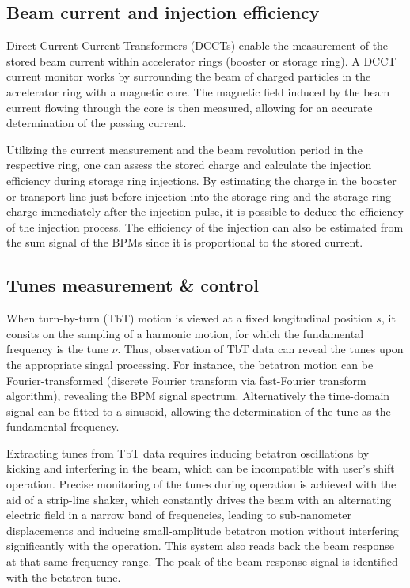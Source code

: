 \subsection{Beam current and injection efficiency}
Direct-Current Current Transformers (DCCTs) enable the measurement of the stored beam current within accelerator rings (booster or storage ring). A DCCT current monitor works by surrounding the beam of charged particles in the accelerator ring with a magnetic core. The magnetic field induced by the beam current flowing through the core is then measured, allowing for an accurate determination of the passing current.

Utilizing the current measurement and the beam revolution period in the respective ring, one can assess the stored charge and calculate the injection efficiency during storage ring injections. By estimating the charge in the booster or transport line just before injection into the storage ring and the storage ring charge immediately after the injection pulse, it is possible to deduce the efficiency of the injection process. The efficiency of the injection can also be estimated from the sum signal of the BPMs since it is proportional to the stored current.

\subsection{Tunes measurement \& control}
When turn-by-turn (TbT) motion is viewed at a fixed longitudinal position $s$, it consits on the sampling of a harmonic motion, for which the fundamental frequency is the tune $\nu$. Thus, observation of TbT data can reveal the tunes upon the appropriate singal processing. For instance, the betatron motion can be Fourier-transformed (discrete Fourier transform via fast-Fourier transform algorithm), revealing the BPM signal spectrum. Alternatively the time-domain signal can be fitted to a sinusoid, allowing the determination of the tune as the fundamental frequency.

Extracting tunes from TbT data requires inducing betatron oscillations by kicking and interfering in the beam, which can be incompatible with user's shift operation. Precise  monitoring of the tunes during operation is achieved with the aid of a strip-line shaker, which constantly drives the beam with an alternating electric field in a narrow band of frequencies, leading to sub-nanometer displacements and inducing small-amplitude betatron motion without interfering significantly with the operation. This system also reads back the beam response at that same frequency range. The peak of the beam response signal is identified with the betatron tune.

